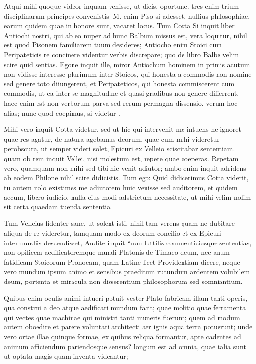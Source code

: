  Atqui mihi quoque videor inquam venisse, ut dicis, oportune. tres enim trium disciplinarum principes convenistis. M. enim Piso si adesset, nullius philosophiae, earum quidem quae in honore sunt, vacaret locus. Tum Cotta Si inquit liber Antiochi nostri, qui ab eo nuper ad hunc Balbum missus est, vera loquitur, nihil est quod Pisonem familiarem tuum desideres; Antiocho enim Stoici cum Peripateticis re concinere videntur verbis discrepare; quo de libro Balbe velim scire quid sentias. Egone inquit ille, miror Antiochum hominem in primis acutum non vidisse interesse plurimum inter Stoicos, qui honesta a commodis non nomine sed genere toto diiungerent, et Peripateticos, qui honesta commiscerent cum commodis, ut ea inter se magnitudine et quasi gradibus non genere differrent. haec enim est non verborum parva sed rerum permagna dissensio. verum hoc alias; nunc quod coepimus, si videtur .

 Mihi vero inquit Cotta videtur. sed ut hic qui intervenit me intuens ne ignoret quae res agatur, de natura agebamus deorum, quae cum mihi videretur perobscura, ut semper videri solet, Epicuri ex Velleio sciscitabar sententiam. quam ob rem inquit Vellei, nisi molestum est, repete quae coeperas. Repetam vero, quamquam non mihi sed tibi hic venit adiutor; ambo enim inquit adridens ab eodem Philone nihil scire didicistis. Tum ego: Quid didicerimus Cotta viderit, tu autem nolo existimes me adiutorem huic venisse sed auditorem, et quidem aecum, libero iudicio, nulla eius modi adstrictum necessitate, ut mihi velim nolim sit certa quaedam tuenda sententia.

 Tum Velleius fidenter sane, ut solent isti, nihil tam verens quam ne dubitare aliqua de re videretur, tamquam modo ex deorum concilio et ex Epicuri intermundiis descendisset, Audite inquit ``non futtilis commenticiasque sententias, non opificem aedificatoremque mundi Platonis de Timaeo deum, nec anum fatidicam Stoicorum Pronoeam, quam Latine licet Providentiam dicere, neque vero mundum ipsum animo et sensibus praeditum rutundum ardentem volubilem deum, portenta et miracula non disserentium philosophorum sed somniantium.

 Quibus enim oculis animi intueri potuit vester Plato fabricam illam tanti operis, qua construi a deo atque aedificari mundum facit; quae molitio quae ferramenta qui vectes quae machinae qui ministri tanti muneris fuerunt; quem ad modum autem oboedire et parere voluntati architecti aer ignis aqua terra potuerunt; unde vero ortae illae quinque formae, ex quibus reliqua formantur, apte cadentes ad animum afficiendum pariendosque sensus? longum est ad omnia, quae talia sunt ut optata magis quam inventa videantur;

